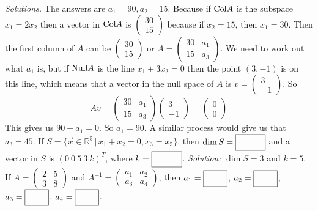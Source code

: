     \ifnum {} {\color{DarkBlue} \textit{Solutions.} The answers are $a_1= 90, a_2 = 15$. Because if $\text{Col} A$ is the subspace $x_1=2x_2$ then a vector in $\text{Col} A$ is $\begin{pmatrix} 30\\15\end{pmatrix}$ because if $x_2=15$, then $x_1=30$. Then the first column of $A$ can be $\begin{pmatrix} 30\\15\end{pmatrix}$ or $A = \begin{pmatrix} 30 & a_1\\ 15 & a_3\end{pmatrix}$. We need to work out what $a_1$ is, but if $\text{Null} A$ is the line $x_1+3x_2=0$ then the point $(3,-1)$ is on this line, which means that a vector in the null space of $A$ is $v = \begin{pmatrix} 3\\-1\end{pmatrix}$. So $$Av = \begin{pmatrix}30&a_1\\15&a_3 \end{pmatrix}\begin{pmatrix} 3\\-1\end{pmatrix} = \begin{pmatrix} 0\\0\end{pmatrix}$$ This gives us $90-a_1=0$. So $a_1 = 90$. A similar process would give us that $a_3 = 45$.
    } 
   \else
   \fi     
\fi 
\ifnum {}
    If $S = \{\vec x \in \mathbb R^5 \, | \, x_1+x_2 = 0, x_3=x_5\}$, then $\dim S = \framebox{\strut\hspace{1cm}}$ and a vector in $S$ is $(0 \ 0 \ 5 \ 3 \ k)^T$, where $k = \framebox{\strut\hspace{1cm}}$. 
    \ifnum {} {\color{DarkBlue} \textit{Solution:} $\dim S = 3$ and $k=5$.  } \fi    
\fi 
\ifnum {}
If $A = \begin{pmatrix} 2&5\\3&8\end{pmatrix}$ and $A^{-1} = \begin{pmatrix} a_1 & a_2 \\ a_3 & a_4 \end{pmatrix}$, then $a_1 = \framebox{\strut\hspace{0.75cm}}$, $a_2 = \framebox{\strut\hspace{0.75cm}}$, $a_3 = \framebox{\strut\hspace{0.75cm}}$, $a_4 = \framebox{\strut\hspace{0.75cm}}$.
    
